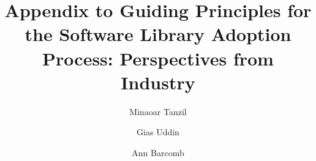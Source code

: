 \documentclass[sigconf,review,anonymous, table]{acmart}
\begin{document}
\title{Appendix to Guiding Principles for the Software Library Adoption Process: Perspectives from Industry}


\author{Minaoar Tanzil}
\author{Gias Uddin}
\author{Ann Barcomb}


\renewcommand{\shortauthors}{Tanzil et al.}

\maketitle
\balance

\end{document}
